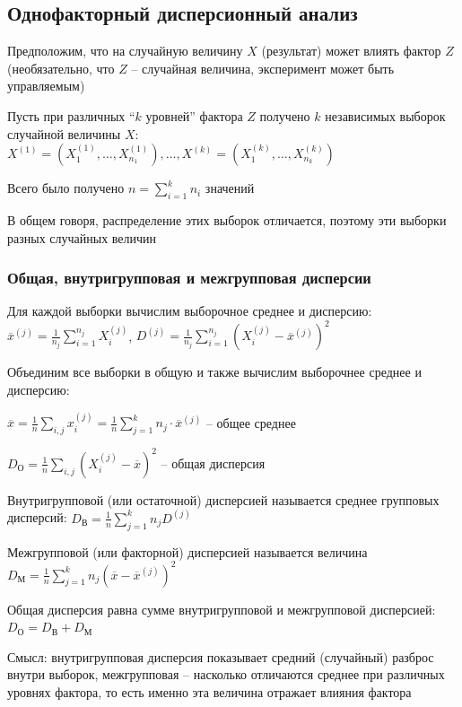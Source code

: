 \subsection{Однофакторный дисперсионный анализ}

Предположим, что на случайную величину $X$ (результат) может влиять фактор $Z$ (необязательно, что $Z$ -- случайная величина, эксперимент может быть управляемым)

Пусть при различных \enquote{$k$ уровней} фактора $Z$ получено $k$ независимых выборок случайной величины $X$: 
$X^{(1)} = (X_1^{(1)}, \dots, X^{(1)}_{n_1}), \dots, X^{(k)} = (X_1^{(k)}, \dots, X^{(k)}_{n_k})$

Всего было получено $n = \sum_{i = 1}^k n_i$ значений

\Nota В общем говоря, распределение этих выборок отличается, поэтому эти выборки разных случайных величин

\subsubsection{Общая, внутригрупповая и межгрупповая дисперсии}

Для каждой выборки вычислим выборочное среднее и дисперсию: $\overline{x}^{(j)} = \frac{1}{n_j} \sum_{i = 1}^{n_j} X_i^{(j)}$, 
$D^{(j)} = \frac{1}{n_j} \sum_{i = 1}^{n_j} (X_i^{(j)} - \overline{x}^{(j)})^2$

Объединим все выборки в общую и также вычислим выборочнее среднее и дисперсию: 

$\overline{x} = \frac{1}{n} \sum_{i, j} x^{(j)}_i = \frac{1}{n} \sum_{j = 1}^k n_j \cdot \overline{x}^{(j)}$ -- общее среднее

$D_\text{О} = \frac{1}{n} \sum_{i, j} (X^{(j)}_i - \overline{x})^2$ -- общая дисперсия

\Def Внутригрупповой (или остаточной) дисперсией называется среднее групповых дисперсий: $D_{\text{В}} = \frac{1}{n} \sum_{j = 1}^k n_j D^{(j)}$

\Def Межгрупповой (или факторной) дисперсией называется величина $D_{\text{М}} = \frac{1}{n} \sum_{j = 1}^k n_j (\overline{x} - \overline{x}^{(j)})^2$

\begin{MyTheorem}
     Общая дисперсия равна сумме внутригрупповой и межгрупповой дисперсией: $D_\text{О} = D_\text{В} + D_\text{М}$
\end{MyTheorem}

Смысл: внутригрупповая дисперсия показывает средний (случайный) разброс внутри выборок, межгрупповая -- насколько отличаются среднее при различных 
уровнях фактора, то есть именно эта величина отражает влияния фактора

